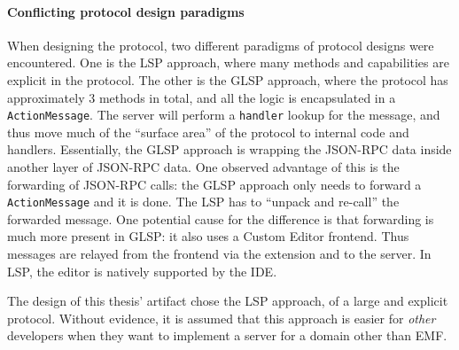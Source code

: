 \paragraph{Conflicting protocol design paradigms}
When designing the protocol, two different paradigms of protocol designs were encountered.
One is the \acrshort{LSP} approach, where many methods and capabilities are explicit in the protocol.
The other is the \acrshort{GLSP} approach, where the protocol has approximately 3 methods in total, and all the logic is encapsulated in a \texttt{ActionMessage}.
The server will perform a \texttt{handler} lookup for the message, and thus move much of the ``surface area'' of the protocol to internal code and handlers.
Essentially, the \acrshort{GLSP} approach is wrapping the \gls{JSON-RPC} data inside another layer of \gls{JSON-RPC} data.
One observed advantage of this is the forwarding of \gls{JSON-RPC} calls: the \acrshort{GLSP} approach only needs to forward a \texttt{ActionMessage} and it is done.
The \acrshort{LSP} has to ``unpack and re-call'' the forwarded message.
One potential cause for the difference is that forwarding is much more present in \acrshort{GLSP}: it also uses a Custom Editor frontend.
Thus messages are relayed from the frontend via the extension and to the server.
In \acrshort{LSP}, the editor is natively supported by the \acrshort{IDE}.

The design of this thesis' artifact chose the \acrshort{LSP} approach, of a large and explicit protocol.
Without evidence, it is assumed that this approach is easier for \textit{other} developers when they want to implement a server for a domain other than \acrshort{EMF}.